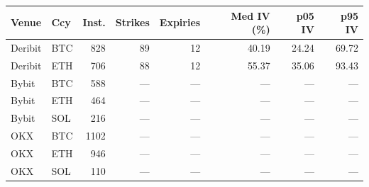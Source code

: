 \begin{tabular}{@{}llrrrrrr@{}}
\toprule
Venue & Ccy & Inst. & Strikes & Expiries & Med IV (\%) & p05 IV & p95 IV \\
\midrule
Deribit & BTC & 828 & 89 & 12 & 40.19 & 24.24 & 69.72 \\
Deribit & ETH & 706 & 88 & 12 & 55.37 & 35.06 & 93.43 \\
Bybit & BTC & 588 & --- & --- & --- & --- & --- \\
Bybit & ETH & 464 & --- & --- & --- & --- & --- \\
Bybit & SOL & 216 & --- & --- & --- & --- & --- \\
OKX & BTC & 1102 & --- & --- & --- & --- & --- \\
OKX & ETH & 946 & --- & --- & --- & --- & --- \\
OKX & SOL & 110 & --- & --- & --- & --- & --- \\
\bottomrule
\end{tabular}
